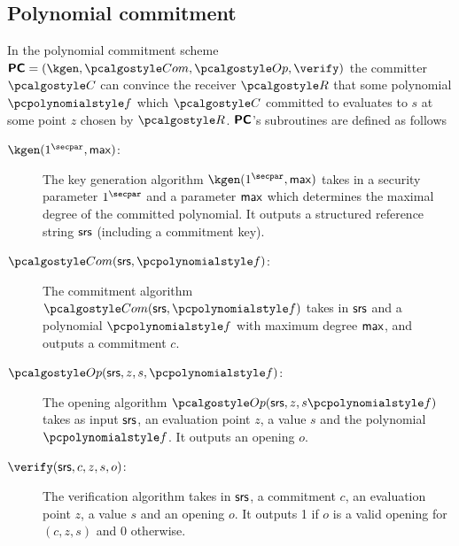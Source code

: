 \documentclass[runningheads,11pt]{llncs}
\begin{document}
\subsection{Polynomial commitment}
\label{sec:poly_com}
In the polynomial commitment scheme $\PCOM = (\kgen, \com, \open, \verify)$ the
committer $\committer$ can convince the receiver $\receiver$ that some
polynomial $\p{f}$ which $\committer$ committed to evaluates to $s$ at some
point $z$ chosen by $\receiver$. $\bm{\mathsf{PC}}$'s subroutines are defined as follows 
\begin{description}
\item[$\kgen(1^\secpar, \maxdeg)$:] The key generation algorithm
  $\kgen(1^\secpar, \maxdeg)$ takes in a security parameter $1^\secpar$ and a
  parameter $\mathsf{max}$ which determines the maximal degree of the committed
  polynomial. It outputs a structured reference string $\mathsf{srs}$ (including a
  commitment key).
\item[$\com(\srs, \p{f})$:] The commitment algorithm $\com(\srs, \p{f})$ takes
  in $\mathsf{srs}$ and a polynomial $\p{f}$ with maximum degree $\mathsf{max}$, and outputs
  a commitment $c$.
\item[$\open(\srs, z, s, \p{f})$:] The opening algorithm
  $\open(\srs, z, s \p{f})$ takes as input $\mathsf{srs}$, an evaluation point $z$, a
  value $s$ and the polynomial $\p{f}$. It outputs an opening $o$.
\item[$\verify(\srs, c, z, s, o)$:] The verification algorithm takes in $\mathsf{srs}$,
  a commitment $c$, an evaluation point $z$, a value $s$ and an opening $o$. It
  outputs 1 if $o$ is a valid opening for $(c, z, s)$ and 0 otherwise.
\end{description}
\end{document}

